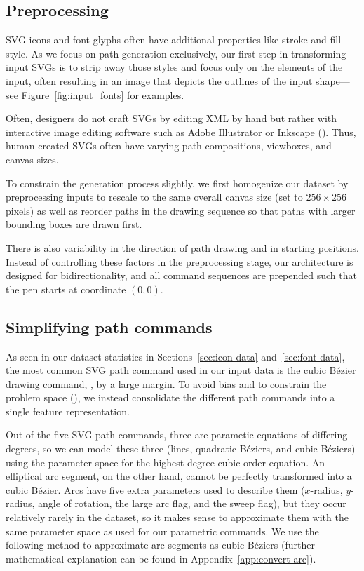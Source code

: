 \subsection{Preprocessing}
SVG icons and font glyphs often have additional properties like stroke and fill style.
As we focus on path generation exclusively, our first step in transforming input SVGs is to strip away those styles and focus only on the  elements of the input, often resulting in an image that depicts the outlines of the input shape---see Figure~\ref{fig:input_fonts} for examples.

Often, designers do not craft SVGs by editing XML by hand but rather with interactive image editing software such as Adobe Illustrator or Inkscape ().
Thus, human-created SVGs often have varying path compositions, viewboxes, and canvas sizes.

To constrain the generation process slightly, we first homogenize our dataset by preprocessing inputs to rescale to the same overall canvas size (set to $256\times 256$ pixels) as well as reorder paths in the drawing sequence so that paths with larger bounding boxes are drawn first.

There is also variability in the direction of path drawing and in starting positions. Instead of controlling these factors in the preprocessing stage, our architecture is designed for bidirectionality, and all command sequences are prepended such that the pen starts at coordinate $(0, 0)$.

\subsection{Simplifying path commands}
As seen in our dataset statistics in Sections~\ref{sec:icon-data} and~\ref{sec:font-data}, the most common SVG path command used in our input data is the cubic B\'ezier drawing command, , by a large margin.
To avoid bias and to constrain the problem space (), we instead consolidate the different path commands into a single feature representation.

Out of the five SVG path commands, three are parametic equations of differing degrees, so we can model these three (lines, quadratic B\'eziers, and cubic B\'eziers) using the parameter space for the highest degree cubic-order equation.
An elliptical arc segment, on the other hand, cannot be perfectly transformed into a cubic B\'ezier. Arcs have five extra parameters used to describe them ($x$-radius, $y$-radius, angle of rotation, the large arc flag, and the sweep flag), but they occur relatively rarely in the dataset, so it makes sense to approximate them with the same parameter space as used for our parametric commands.
We use the following method to approximate arc segments as cubic B\'eziers (further mathematical explanation can be found in Appendix~\ref{app:convert-arc}).

